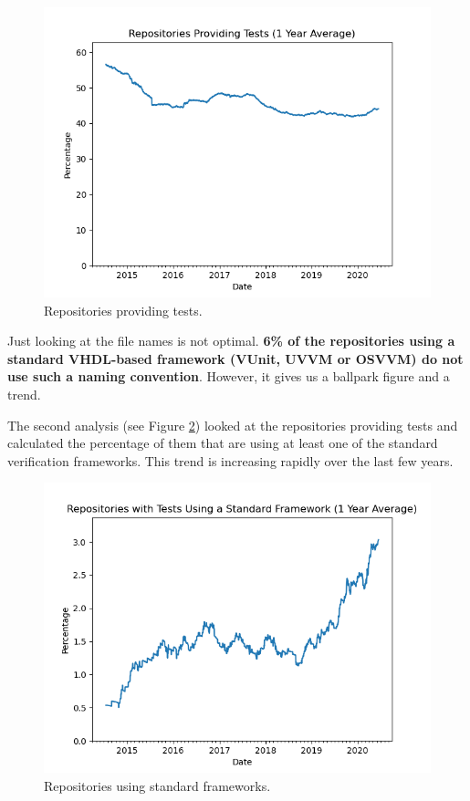 \documentclass[]{report}
\begin{document}
\begin{figure}

{\centering \includegraphics[width=0.85\linewidth]{img/repositories_providing_tests} 

}

\caption{Repositories providing tests.}\label{fig:repositories}
\end{figure}

Just looking at the file names is not optimal. \textbf{6\% of the repositories using a standard VHDL-based framework (VUnit, UVVM or OSVVM) do not use such a naming convention}. However, it gives us a ballpark figure and a trend.

The second analysis (see Figure \ref{fig:standard}) looked at the repositories providing tests and calculated the percentage of them that are using at least one of the standard verification frameworks. This trend is increasing rapidly over the last few years.

\begin{figure}

{\centering \includegraphics[width=0.85\linewidth]{img/repositories_using_std_framework} 

}

\caption{Repositories using standard frameworks.}\label{fig:standard}
\end{figure}
\end{document}
